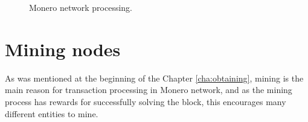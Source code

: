 \documentclass[
  printed, %
  table,   %
  lof,     %
  lot,     %
           oneside, color
]{fithesis3}
\begin{document}
\begin{figure}[H]
\caption{Monero network processing.}
\label{pict:network-processing}
\end{figure}
\newpage
\section{Mining nodes}
As was mentioned at the beginning of the Chapter \ref{cha:obtaining}, mining is the main reason for transaction processing in Monero network, and as the mining process has rewards for successfully solving the block, this encourages many different entities to mine.
\end{document}
